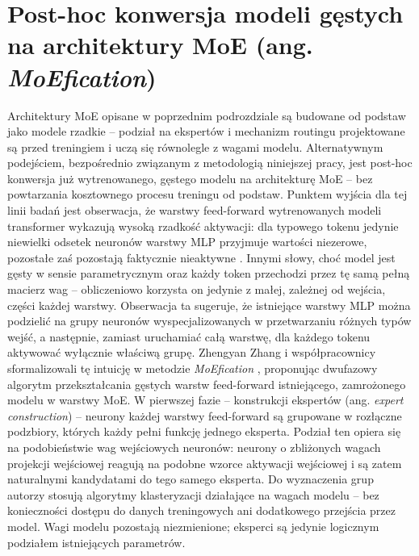 \section{Post-hoc konwersja modeli gęstych na architektury MoE (ang. \textit{MoEfication})}
\label{sec:moefication}
Architektury MoE opisane w poprzednim podrozdziale są budowane od podstaw jako modele rzadkie -- podział na ekspertów i mechanizm routingu projektowane są przed treningiem i uczą się równolegle z wagami modelu. Alternatywnym podejściem, bezpośrednio związanym z metodologią niniejszej pracy, jest post-hoc konwersja już wytrenowanego, gęstego modelu na architekturę MoE -- bez powtarzania kosztownego procesu treningu od podstaw. \newline
Punktem wyjścia dla tej linii badań jest obserwacja, że warstwy feed-forward wytrenowanych modeli transformer wykazują wysoką rzadkość aktywacji: dla typowego tokenu jedynie niewielki odsetek neuronów warstwy MLP przyjmuje wartości niezerowe, pozostałe zaś pozostają faktycznie nieaktywne \cite{zhang_2022_moefication}. Innymi słowy, choć model jest gęsty w sensie parametrycznym oraz każdy token przechodzi przez tę samą pełną macierz wag -- obliczeniowo korzysta on jedynie z małej, zależnej od wejścia, części każdej warstwy. Obserwacja ta sugeruje, że istniejące warstwy MLP można podzielić na grupy neuronów wyspecjalizowanych w przetwarzaniu różnych typów wejść, a następnie, zamiast uruchamiać całą warstwę, dla każdego tokenu aktywować wyłącznie właściwą grupę. \newline
Zhengyan Zhang i współpracownicy sformalizowali tę intuicję w metodzie \textit{MoEfication} \cite{zhang_2022_moefication}, proponując dwufazowy algorytm przekształcania gęstych warstw feed-forward istniejącego, zamrożonego modelu w warstwy MoE. W pierwszej fazie -- konstrukcji ekspertów (ang. \textit{expert construction}) -- neurony każdej warstwy feed-forward są grupowane w rozłączne podzbiory, których każdy pełni funkcję jednego eksperta. Podział ten opiera się na podobieństwie wag wejściowych neuronów: neurony o zbliżonych wagach projekcji wejściowej reagują na podobne wzorce aktywacji wejściowej i są zatem naturalnymi kandydatami do tego samego eksperta. Do wyznaczenia grup autorzy stosują algorytmy klasteryzacji działające na wagach modelu -- bez konieczności dostępu do danych treningowych ani dodatkowego przejścia przez model. Wagi modelu pozostają niezmienione; eksperci są jedynie logicznym podziałem istniejących parametrów. \newline
